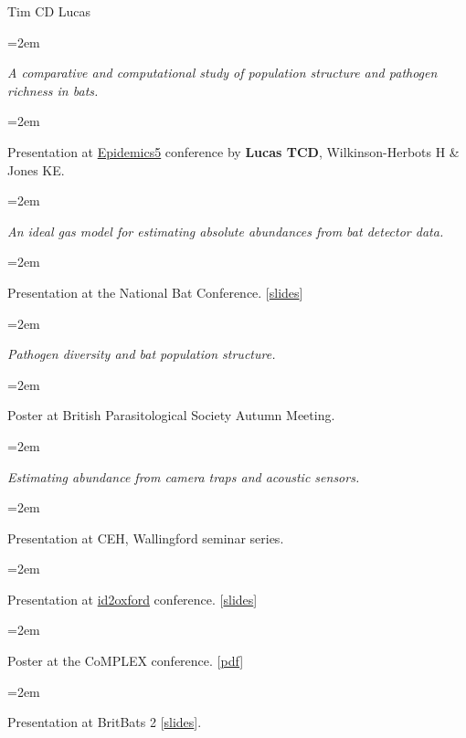 \documentclass{scrartcl}
\newcommand{\MarginText}[1]{\marginpar{\raggedleft\itshape\small#1}} %
\newcommand{\Description}[1]{\hangindent=2em\hangafter=0\noindent\raggedright\footnotesize{#1}\par\normalsize\vspace{1em}} %
\newcommand{\MoreDescription}[1]{\hangindent=2em\hangafter=0\noindent\raggedright\scriptsize{#1}\par\normalsize\vspace{1em}} %
\begin{document}
\begin{cv}{Tim {\Large CD} Lucas}
\vspace{-0.5em}

\Description{\emph{A comparative and computational study of population structure and pathogen richness in bats.}}\vspace{-1em}
\MoreDescription{Presentation at \href{http://www.epidemics.elsevier.com/}{Epidemics5} conference by \textbf{Lucas TCD}, Wilkinson-Herbots H \& Jones KE.}

\vspace{-0.5em}



\Description{\emph{An ideal gas model for estimating absolute abundances from bat detector data.}}\vspace{-1em}
\MoreDescription{Presentation at the National Bat Conference. [\href{http://www.slideshare.net/timcdlucas/tim-lucasnbc}{slides}]}

\vspace{-0.5em}

\Description{\emph{Pathogen diversity and bat population structure.}}\vspace{-1em}
\MoreDescription{Poster at British Parasitological Society Autumn Meeting.}


\vspace{-0.5em}

\Description{\emph{Estimating abundance from camera traps and acoustic sensors.}}\vspace{-1em}
\MoreDescription{Presentation at {\footnotesize CEH}, Wallingford seminar series.}


\vspace{-0.5em}

\Description{\MarginText{2014}Presentation at \href{http://id2-ox.co.uk/}{id2oxford} conference. [\href{http://www.slideshare.net/timcdlucas/tim-lucasid2ox}{slides}]}
\vspace{-0.5em}

\Description{Poster at the {\footnotesize CoMPLEX} conference. [\href{http://figshare.com/articles/Estimating_abundance_from_camera_traps_and_acoustic_sensors/1321269}{pdf}]}
\vspace{-0.5em}

\Description{\MarginText{2013}Presentation at BritBats 2 [\href{http://www.slideshare.net/timcdlucas/tim-lucasbritbats}{slides}].}

\vspace{-0.5em} %


\end{cv}
\end{document}
